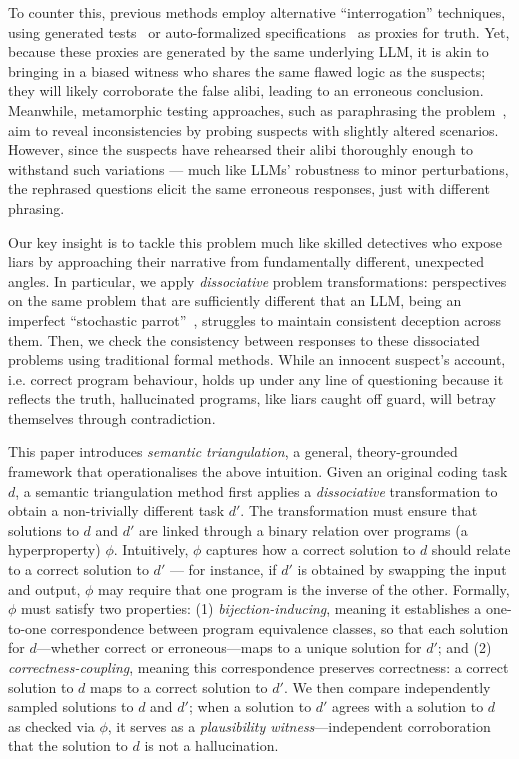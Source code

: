 \documentclass[acmsmall,screen,nonacm]{acmart}
\begin{document}
To counter this, previous methods employ alternative ``interrogation'' techniques, using generated tests~\cite{huang2023agentcoder,taherkhani2024valtest} or auto-formalized specifications~\cite{endres2024can,misu2024towards}  as proxies for truth. Yet, because these proxies are generated by the same underlying LLM, it is akin to bringing in a biased witness who shares the same flawed logic as the suspects; they will likely corroborate the false alibi, leading to an erroneous conclusion. Meanwhile, metamorphic testing approaches, such as paraphrasing the problem~\cite{wang2024validating}, aim to reveal inconsistencies by probing suspects with slightly altered scenarios. However, since the suspects have rehearsed their alibi thoroughly enough to withstand such variations --- much like LLMs' robustness to minor perturbations, the rephrased questions elicit the same erroneous responses, just with different phrasing.

Our key insight is to tackle this problem much like skilled detectives who expose liars by approaching their narrative from fundamentally different, unexpected angles. In particular, we apply \emph{dissociative} problem transformations: perspectives on the same problem that are sufficiently different that an LLM, being an imperfect ``stochastic parrot''~\cite{shani2025tokens,bender2021dangers}, struggles to maintain consistent deception across them. Then, we check the consistency between responses to these dissociated problems using traditional formal methods. While an innocent suspect's account, i.e. correct program behaviour, holds up under any line of questioning because it reflects the truth, hallucinated programs, like liars caught off guard, will betray themselves through contradiction.


This paper introduces \emph{semantic triangulation}, a general, theory-grounded framework that operationalises the above intuition. Given an original coding task $d$, a semantic triangulation method first applies a \emph{dissociative} transformation to obtain a non-trivially different task $d'$. The transformation must ensure that solutions to $d$ and $d'$ are linked through a binary relation over programs (a hyperproperty) $\phi$. Intuitively, $\phi$ captures how a correct solution to $d$ should relate to a correct solution to $d'$ --- for instance, if $d'$ is obtained by swapping the input and output, $\phi$ may require that one program is the inverse of the other. Formally, $\phi$ must satisfy two properties: (1) \emph{bijection-inducing}, meaning it establishes a one-to-one correspondence between program equivalence classes, so that each solution for $d$---whether correct or erroneous---maps to a unique solution for $d'$; and (2) \emph{correctness-coupling}, meaning this correspondence preserves correctness: a correct solution to $d$ maps to a correct solution to $d'$. We then compare independently sampled solutions to $d$ and $d'$; when a solution to $d'$ agrees with a solution to $d$ as checked via $\phi$, it serves as a \emph{plausibility witness}---independent corroboration that the solution to $d$ is not a hallucination.
\end{document}
